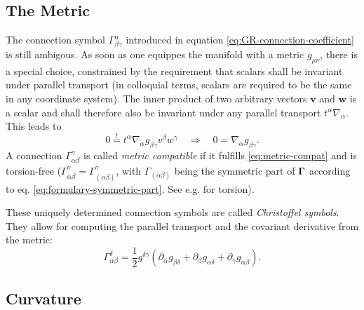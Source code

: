 \documentclass[12pt,a4paper]{report}
\numberwithin{equation}{chapter}
\begin{document}
\subsection{The Metric}
The connection symbol $\Gamma^\alpha_{\beta\gamma}$ introduced in equation \eqref{eq:GR-connection-coefficient} is still ambigous. As soon as one equippes the manifold with a metric $g_{\mu\nu}$, there is a special choice, constrained by the requirement that scalars shall be invariant under parallel transport (in colloquial terms, scalars are required to be the same in any coordinate system). The inner product of two arbitrary vectors $\boldsymbol{v}$ and $\boldsymbol{w}$ is a scalar and shall therefore also be invariant under any parallel transport $t^\alpha \nabla_\alpha$. This leads to
\begin{equation} \label{eq:metric-compat}
0 \stackrel != t^\alpha \nabla_\alpha g_{\beta\gamma} v^\beta w^\gamma
\quad\Rightarrow\quad 0 = \nabla_\alpha g_{\beta\gamma}.
\end{equation}
A connection $\Gamma_{\alpha\beta}^\gamma$ is called \emph{metric compatible} if it fulfills \eqref{eq:metric-compat} and is torsion-free ($\Gamma_{\alpha\beta}^\gamma = \Gamma_{(\alpha\beta)}^\gamma$, with $\Gamma_{(\alpha\beta)}$ being the symmetric part of $\boldsymbol{ \Gamma }$ according to eq. \eqref{eq:formulary-symmetric-part}. See e.g. \cite[page 99]{carroll} for torsion).

These uniquely determined connection symbols are called \emph{Christoffel symbols}. They allow for computing the parallel transport and the covariant derivative from the metric:
\begin{equation}
\Gamma^\delta_{\alpha\beta} = \frac{1}{2}
g^{\delta \gamma}
(\partial_\alpha g_{\beta \delta}
+ \partial_\beta g_{\alpha \delta}
+ \partial_\gamma g_{\alpha \beta}
).
\end{equation}

\subsection{Curvature}
\end{document}
